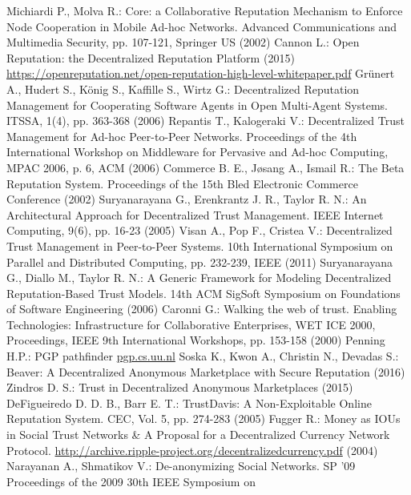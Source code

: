 \begin{thebibliography}{40}
   Michiardi P., Molva R.: Core: a Collaborative Reputation Mechanism to Enforce Node Cooperation in Mobile Ad-hoc
   Networks. Advanced Communications and Multimedia Security, pp. 107-121, Springer US (2002)
   Cannon L.: Open Reputation: the Decentralized Reputation Platform (2015)
   \url{https://openreputation.net/open-reputation-high-level-whitepaper.pdf}
   Gr\"unert A., Hudert S., K\"onig S., Kaffille S., Wirtz G.: Decentralized Reputation Management for Cooperating Software
   Agents in Open Multi-Agent Systems. ITSSA, 1(4), pp. 363-368 (2006)
   Repantis T., Kalogeraki V.: Decentralized Trust Management for Ad-hoc Peer-to-Peer Networks. Proceedings of the 4th
   International Workshop on Middleware for Pervasive and Ad-hoc Computing, MPAC 2006, p. 6, ACM (2006)
   Commerce B. E., J\o{}sang A., Ismail R.: The Beta Reputation System. Proceedings of the 15th Bled Electronic Commerce
   Conference (2002)
   Suryanarayana G., Erenkrantz J. R., Taylor R. N.: An Architectural Approach for Decentralized Trust Management. IEEE
   Internet Computing, 9(6), pp. 16-23 (2005)
   Visan A., Pop F., Cristea V.: Decentralized Trust Management in Peer-to-Peer Systems. 10th International Symposium on
   Parallel and Distributed Computing, pp. 232-239, IEEE (2011)
   Suryanarayana G., Diallo M., Taylor R. N.: A Generic Framework for Modeling Decentralized Reputation-Based Trust Models.
   14th ACM SigSoft Symposium on Foundations of Software Engineering (2006)
   Caronni G.: Walking the web of trust. Enabling Technologies: Infrastructure for Collaborative Enterprises, WET ICE 2000,
   Proceedings, IEEE 9th International Workshops, pp. 153-158 (2000)
   Penning H.P.: PGP pathfinder \url{pgp.cs.uu.nl}
   Soska K., Kwon A., Christin N., Devadas S.: Beaver: A Decentralized Anonymous Marketplace with Secure Reputation (2016)
   Zindros D. S.: Trust in Decentralized Anonymous Marketplaces (2015)
   DeFigueiredo D. D. B., Barr E. T.: TrustDavis: A Non-Exploitable Online Reputation System. CEC, Vol. 5, pp. 274-283
   (2005)
   Fugger R.: Money as IOUs in Social Trust Networks \& A Proposal for a Decentralized Currency Network Protocol.
   \url{http://archive.ripple-project.org/decentralizedcurrency.pdf} (2004)
   Narayanan A., Shmatikov V.: De-anonymizing Social Networks. SP '09 Proceedings of the 2009 30th IEEE Symposium on

\end{thebibliography}
